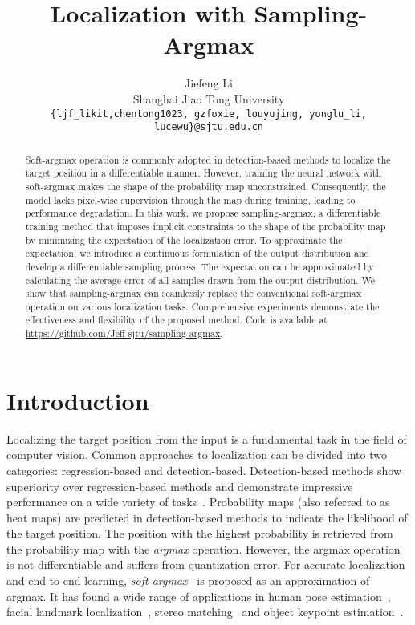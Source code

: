 \documentclass{article}
\title{Localization with Sampling-Argmax}
\author{{Jiefeng Li} \quad {Tong Chen} \quad {Ruiqi Shi} \quad {Yujing Lou} \quad {Yong-Lu Li} \quad {Cewu Lu} \\
  Shanghai Jiao Tong University \\
  \texttt{\{{ljf\_likit},{chentong1023}, {gzfoxie}, {louyujing}, {yonglu\_li}, {lucewu}\}@{sjtu.edu.cn}} \\
}
\begin{document}
\maketitle

\begin{abstract}
  Soft-argmax operation is commonly adopted in detection-based methods to localize the target position in a differentiable manner. However, training the neural network with soft-argmax makes the shape of the probability map unconstrained. Consequently, the model lacks pixel-wise supervision through the map during training, leading to performance degradation. In this work, we propose sampling-argmax, a differentiable training method that imposes implicit constraints to the shape of the probability map by minimizing the expectation of the localization error. To approximate the expectation, we introduce a continuous formulation of the output distribution and develop a differentiable sampling process. The expectation can be approximated by calculating the average error of all samples drawn from the output distribution. We show that sampling-argmax can seamlessly replace the conventional soft-argmax operation on various localization tasks. Comprehensive experiments demonstrate the effectiveness and flexibility of the proposed method. Code is available at \href{https://github.com/Jeff-sjtu/sampling-argmax}{https://github.com/Jeff-sjtu/sampling-argmax}.
\end{abstract}



\section{Introduction}

Localizing the target position from the input is a fundamental task in the field of computer vision. Common approaches to localization can be divided into two categories: regression-based and detection-based. Detection-based methods show superiority over regression-based methods and demonstrate impressive performance on a wide variety of tasks~\cite{zhou2017unsupervised,integral,zhang2018deep,he2019fully,lee2019sfnet,honari2018improving,li2019crowdpose,joung2020cylindrical,spezialetti2020learning,li2021hybrik,shi2021skeleton}. Probability maps (also referred to as heat maps) are predicted in detection-based methods to indicate the likelihood of the target position. The position with the highest probability is retrieved from the probability map with the \textit{argmax} operation. However, the argmax operation is not differentiable and suffers from quantization error. For accurate localization and end-to-end learning, \textit{soft-argmax}~\cite{goroshin2015learning,finn2016deep} is proposed as an approximation of argmax. It has found a wide range of applications in human pose estimation~\cite{integral,luvizon20182d,luvizon2019human,wang2020hmor}, facial landmark localization~\cite{honari2018improving,liu2019grand,chandran2020attention}, stereo matching~\cite{zhou2017unsupervised,kendall2017end,duggal2019deeppruner} and object keypoint estimation~\cite{shi2021skeleton}.
\end{document}
